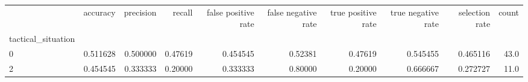 \begin{tabular}{lrrrrrrrrr}
\toprule
{} &  accuracy &  precision &   recall &  false positive rate &  false negative rate &  true positive rate &  true negative rate &  selection rate &  count \\
tactical\_situation &           &            &          &                      &                      &                     &                     &                 &        \\
\midrule
0                  &  0.511628 &   0.500000 &  0.47619 &             0.454545 &              0.52381 &             0.47619 &            0.545455 &        0.465116 &   43.0 \\
2                  &  0.454545 &   0.333333 &  0.20000 &             0.333333 &              0.80000 &             0.20000 &            0.666667 &        0.272727 &   11.0 \\
\bottomrule
\end{tabular}

